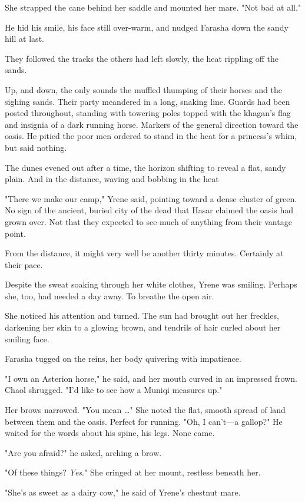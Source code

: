 She strapped the cane behind her saddle and mounted her mare. "Not bad at all."

He hid his smile, his face still over-warm, and nudged Farasha down the sandy hill at last.

They followed the tracks the others had left slowly, the heat rippling off the sands.

Up, and down, the only sounds the muffled thumping of their horses and the sighing sands. Their party meandered in a long, snaking line. Guards had been posted throughout, standing with towering poles topped with the khagan's flag and insignia of a dark running horse. Markers of the general direction toward the oasis. He pitied the poor men ordered to stand in the heat for a princess's whim, but said nothing.

The dunes evened out after a time, the horizon shifting to reveal a flat, sandy plain. And in the distance, waving and bobbing in the heat


"There we make our camp," Yrene said, pointing toward a dense cluster of green. No sign of the ancient, buried city of the dead that Hasar claimed the oasis had grown over. Not that they expected to see much of anything from their vantage point.

From the distance, it might very well be another thirty minutes. Certainly at their pace.

Despite the sweat soaking through her white clothes, Yrene was smiling. Perhaps she, too, had needed a day away. To breathe the open air.

She noticed his attention and turned. The sun had brought out her freckles, darkening her skin to a glowing brown, and tendrils of hair curled about her smiling face.

Farasha tugged on the reins, her body quivering with impatience.

"I own an Asterion horse," he said, and her mouth curved in an impressed frown. Chaol shrugged. "I'd like to see how a Muniqi measures up."

Her brows narrowed. "You mean \ldots" She noted the flat, smooth spread of land between them and the oasis. Perfect for running. "Oh, I can't---a gallop?" He waited for the words about his spine, his legs. None came.

"Are you afraid?" he asked, arching a brow.

"Of these things? \emph{Yes}." She cringed at her mount, restless beneath her.

"She's as sweet as a dairy cow," he said of Yrene's chestnut mare.

